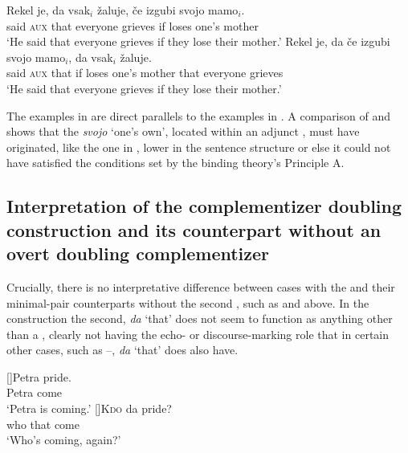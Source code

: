 \documentclass[output=paper,colorlinks,citecolor=brown]{langsci/langscibook}
\begin{document}
\begin{exe}
\ex \begin{xlist} \label{ex:plesnicar:six}
\ex \label{ex:plesnicar:sixa}
\gll Rekel 	je, 	da 	vsak$_i$ 		žaluje, 	če 	izgubi 	svojo 	mamo$_i$.\\
	said 	\textsc{aux}	that	everyone	grieves	if	loses	one’s	mother \\
\trans `He said that everyone grieves if they lose their mother.'
\ex \label{ex:plesnicar:sixb}
\gll	Rekel 	je, 	da 	če 	izgubi 	svojo 	mamo$_i$, da 	vsak$_i$ 		žaluje. 	\\
	said	\textsc{aux}	that	if	loses	one’s	mother	 that	everyone	grieves \\
\trans `He said that everyone grieves if they lose their mother.'
\end{xlist}\end{exe}

\noindent The examples in  are direct parallels to the examples in . A comparison of  and  shows that the   \textit{svojo} `one’s own', located within an adjunct , must have originated, like the one in , lower in the sentence structure or else it could not have satisfied the conditions set by the binding theory’s Principle A.


\subsection{Interpretation of the complementizer doubling construction and its counterpart without an overt doubling complementizer} \label{s22}

Crucially, there is no interpretative difference between cases with the   and their minimal-pair counterparts without the second , such as  and  above. In the  construction the second,  \textit{da} `that' does not seem to function as anything other than a  , clearly not having the echo- or discourse-marking role that in certain other cases, such as --, \textit{da} `that' does also have.

\begin{exe}
 \ex \label{ex:plesnicar:seven}
 \begin{xlist}
 []{\gll Petra	pride.\\
	Petra	come\\
    \trans `Petra is coming.'}
  []{\gll \textsc{Kdo}	da 	pride?\\
  who	that		come\\
 \trans `Who’s coming, again?'}
 \end{xlist}
\end{exe}
\end{document}
